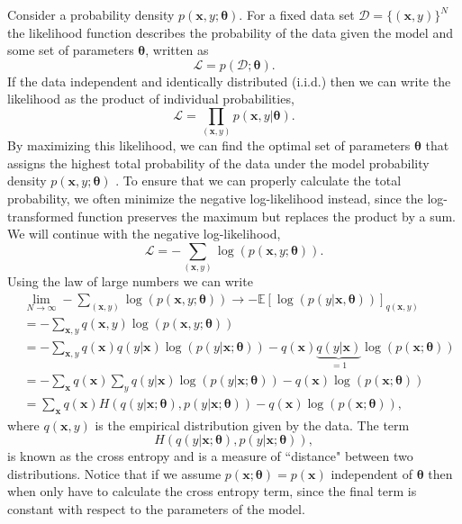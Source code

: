 \noindent Consider a probability density $p(\mathbf{x},y; \bm{\theta})$. For a fixed data set $\mathcal{D} = \{(\mathbf{x},y)\}^N$ the likelihood function describes the probability of the data given the model and some set of parameters $\bm{\theta}$, written as
\begin{equation}
    \mathcal{L} = p(\mathcal{D};\bm{\theta}).
\end{equation}
If the data independent and identically distributed (i.i.d.) then we can write the likelihood as the product of individual probabilities,
\begin{equation}
    \mathcal{L} = \prod_{(\mathbf{x},y)} p(\mathbf{x}, y|\bm{\theta}).
\end{equation}
By maximizing this likelihood, we can find the optimal set of parameters $\bm{\theta}$ that assigns the highest total probability of the data under the model probability density $p(\mathbf{x},y;\bm{\theta})$ \cite{Murphy2012}.
To ensure that we can properly calculate the total probability, we often minimize the negative log-likelihood instead, since the log-transformed function preserves the maximum but replaces the product by a sum. We will continue with the negative log-likelihood,
\begin{equation}
    \mathcal{L} = -\sum_{(\mathbf{x}, y)}\log( p(\mathbf{x},y; \bm{\theta})).
\end{equation}
Using the law of large numbers we can write 
\begin{align*}
    &\lim\limits_{N\to \infty} -\sum_{(\mathbf{x},y)} \log( p(\mathbf{x},y; \bm{\theta})) \rightarrow -\mathbb{E}\left[\log( p(y|\mathbf{x},\bm{\theta})) \right]_{ q(\mathbf{x},y)}\\
    &= -\sum_{\mathbf{x},y} q(\mathbf{x},y) \log( p(\mathbf{x},y;\bm{\theta}))\\
    &= -\sum_{\mathbf{x},y} q(\mathbf{x}) q(y|\mathbf{x})\log( p(y|\mathbf{x} ;\bm{\theta})) - q(\mathbf{x})\underbrace{q(y|\mathbf{x})}_{=1}\log(p(\mathbf{x};\bm{\theta}))\\
    &= -\sum_{\mathbf{x}} q(\mathbf{x}) \sum_y q(y|\mathbf{x})\log( p(y|\mathbf{x} ;\bm{\theta})) - q(\mathbf{x})\log(p(\mathbf{x};\bm{\theta}))\\
    & = \sum_{\mathbf{x}} q(\mathbf{x}) H(q(y|\mathbf{x};\bm{\theta}),p(y|\mathbf{x};\bm{\theta}))- q(\mathbf{x})\log(p(\mathbf{x};\bm{\theta})),
\end{align*}
where $ q(\mathbf{x},y)$ is the empirical distribution given by the data. The term
\begin{equation}
    H(q(y|\mathbf{x};\bm{\theta}),p(y|\mathbf{x};\bm{\theta})),
\end{equation} 
is known as the cross entropy and is a measure of ``distance" between two distributions. Notice that if we assume $p(\mathbf{x};\bm{\theta})=p(\mathbf{x})$ independent of $\bm{\theta}$ then when only have to calculate the cross entropy term, since the final term is constant with respect to the parameters of the model. \newline 

